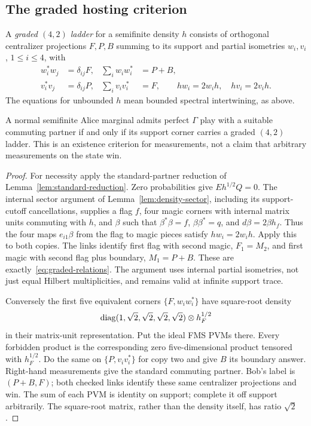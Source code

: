 \subsection{The graded hosting criterion}\label{sec:graded}
A \emph{graded $(4,2)$ ladder} for a semifinite density $h$ consists of orthogonal centralizer projections $F,P,B$ summing to its support and partial isometries $w_i,v_i$, $1\le i\le4$, with
\begin{align}\label{eq:graded-relations}
 w_i^*w_j&=\delta_{ij}F,&\sum_iw_iw_i^*&=P+B,\nonumber\\
 v_i^*v_j&=\delta_{ij}P,&\sum_iv_iv_i^*&=F,
 \qquad hw_i=2w_i h,\quad hv_i=2v_i h.
\end{align}
The equations for unbounded $h$ mean bounded spectral intertwining, as above.

\begin{theorem}\label{thm:graded-hosting}
A normal semifinite Alice marginal admits perfect $\Gamma$ play with a suitable commuting partner if and only if its support corner carries a graded $(4,2)$ ladder. This is an existence criterion for measurements, not a claim that arbitrary measurements on the state win.
\end{theorem}
\begin{proof}
For necessity apply the standard-partner reduction of Lemma~\ref{lem:standard-reduction}. Zero probabilities give $E h^{1/2}Q=0$. The internal sector argument of Lemma~\ref{lem:density-sector}, including its support-cutoff cancellations, supplies a flag $f$, four magic corners with internal matrix units commuting with $h$, and $\beta$ such that $\beta^*\beta=f$, $\beta\beta^*=q$, and $d\beta=2\beta h_f$. Thus the four maps $e_{i1}\beta$ from the flag to magic pieces satisfy $hw_i=2w_i h$. Apply this to both copies. The links identify first flag with second magic, $F_1=M_2$, and first magic with second flag plus boundary, $M_1=P+B$. These are exactly~\eqref{eq:graded-relations}. The argument uses internal partial isometries, not just equal Hilbert multiplicities, and remains valid at infinite support trace.

Conversely the first five equivalent corners $\{F,w_iw_i^*\}$ have square-root density
\[
 \operatorname{diag}(1,\sqrt2,\sqrt2,\sqrt2,\sqrt2)\otimes h_F^{1/2}
\]
in their matrix-unit representation. Put the ideal FMS PVMs there. Every forbidden product is the corresponding zero five-dimensional product tensored with $h_F^{1/2}$. Do the same on $\{P,v_iv_i^*\}$ for copy two and give $B$ its boundary answer. Right-hand measurements give the standard commuting partner. Bob's label is $(P+B,F)$; both checked links identify these same centralizer projections and win. The sum of each PVM is identity on support; complete it off support arbitrarily. The square-root matrix, rather than the density itself, has ratio $\sqrt2$.
\end{proof}

